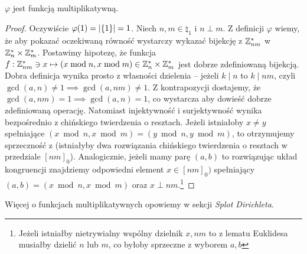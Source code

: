 \begin{theorem}
	\label{nt:phimulti}
	\(\varphi\) jest funkcją multiplikatywną.
\end{theorem}
\begin{proof}
	Oczywiście \(\varphi(1) = \card{\set{1}} = 1\). Niech \(n, m \in \natural_1\) i \(n \perp m\).
	Z definicji \(\varphi\) wiemy, że aby pokazać oczekiwaną równość wystarczy wykazać bijekcję z \(\mathbb{Z}_{nm}^*\) w \(\mathbb{Z}_n^* \times \mathbb{Z}_m^*\).
	Postawimy hipotezę, że funkcja \(f: \mathbb{Z}_{nm}^* \ni x \mapsto (x \bmod n, x \bmod m) \in \mathbb{Z}_n^* \times \mathbb{Z}_m^*\) jest dobrze zdefiniowaną
	bijekcją.
	Dobra definicja wynika prosto z własności dzielenia -- jeżeli \(k \mid n\) to \(k \mid nm\), czyli \(\gcd(a,n) \neq 1 \implies \gcd(a, nm) \neq 1\).
	Z kontrapozycji dostajemy, że \(\gcd(a, nm) = 1 \implies \gcd(a, n) = 1\), co wystarcza aby dowieść dobrze zdefiniowaną operację.
	Natomiast injektywność i surjektywność wynika bezpośrednio z chińskiego twierdzenia o resztach.
	Jeżeli istniałoby \(x \neq y\) spełniające \((x \bmod n, x \bmod m) = (y \bmod n, y \bmod m)\), to otrzymujemy sprzeczność z
	(istniałyby dwa rozwiązania chińskiego twierdzenia o resztach w przedziale \([nm]_0\)). Analogicznie, jeżeli mamy parę \((a, b)\) to rozwiązując układ kongruencji znajdziemy
	odpowiedni element \(x \in [nm]_0)\) spełniający \((a, b) = (x \bmod n, x \bmod m)\) oraz \(x \perp nm\).\footnote{Jeżeli istniałby nietrywialny wspólny dzielnik \(x, nm\) to z lematu Euklidesa musiałby dzielić \(n\) lub \(m\), co byłoby sprzeczne z wyborem \(a, b\)}
\end{proof}
Więcej o funkcjach multiplikatywnych opowiemy w sekcji \textit{Splot Dirichleta}.

